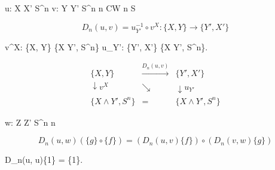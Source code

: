  u: X \wedge X' \to S^n  v: Y \wedge Y' \to S^n  n CW n S

$$D_n(u, v) = u_{Y'}^{-1} \circ v^X: \{X, Y\} \to \{Y', X'\}$$

 v^X: \{X, Y\} \to \{X \wedge Y', S^n\}  u_{Y'}: \{Y', X'\} \to \{X \wedge Y', S^n\}.


$$\begin{array}{ccc}
\{X, Y\} & \xrightarrow{D_n(u,v)} & \{Y', X'\} \\
\downarrow v^X & \searrow & \downarrow u_{Y'} \\
\{X \wedge Y', S^n\} & = & \{X \wedge Y', S^n\}
\end{array}$$

 w: Z \wedge Z' \to S^n  n

$$D_n(u, w)(\{g\} \circ \{f\}) = (D_n(u, v)\{f\}) \circ (D_n(v, w)\{g\})$$

 D_n(u, u)\{1\} = \{1\}. 